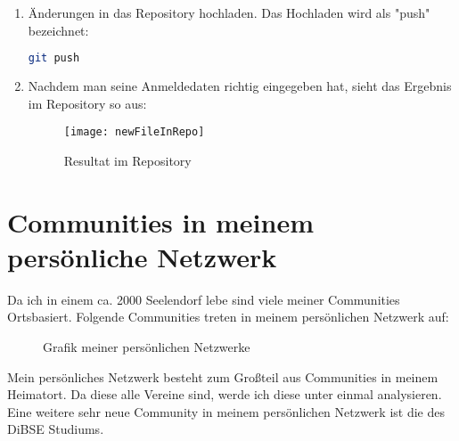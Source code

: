 \documentclass[12pt]{article}
\begin{document}
\begin{enumerate}
 \item Änderungen in das Repository hochladen. Das Hochladen wird als "push" bezeichnet:
 \begin{lstlisting}[caption={Hochladen der Änderungen},language=Bash,frame=single]
  git push
 \end{lstlisting}
 \item Nachdem man seine Anmeldedaten richtig eingegeben hat, sieht das Ergebnis im Repository so aus:
 \begin{figure}[h]
  \begin{center}
   \texttt{[image: newFileInRepo]}
   \caption{Resultat im Repository}
  \end{center}
 \end{figure}
 \end{enumerate}
\pagebreak
\section{Communities in meinem persönliche Netzwerk}
Da ich in einem ca. 2000 Seelendorf lebe sind viele meiner Communities Ortsbasiert. Folgende Communities treten in meinem persönlichen Netzwerk auf:
\begin{figure}[H]
\begin{center}
\end{center}
\caption{Grafik meiner persönlichen Netzwerke}
\label{fig:communities}
\end{figure}
\flushleft Mein persönliches Netzwerk besteht zum Großteil aus Communities in meinem Heimatort. Da diese alle Vereine sind, werde ich diese unter einmal analysieren. Eine weitere sehr neue Community in meinem persönlichen Netzwerk ist die des DiBSE Studiums.
\pagebreak
\end{document}
